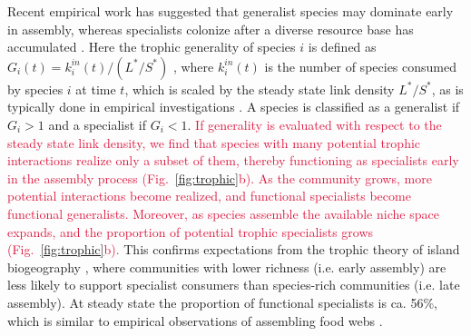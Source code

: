 \documentclass[twocolumn,preprintnumbers,amsmath,amssymb,superscriptaddress,linenumbers]{revtex4-1}
\newcommand{\rr}[1]{{\rm #1}}
\newcommand{\rev}[1]{\textcolor{crimson}{#1}}
\begin{document}
% 




Recent empirical work has suggested that generalist species may dominate early in assembly, whereas specialists colonize after a diverse resource base has accumulated \cite{Piechnik2008,Gravel2011}.
Here the trophic generality of species $i$ is defined as $G_i(t) = k_i^{in}(t)/(L^*/S^*)$ \cite{Williams2000}, where $k_i^{in}(t)$ is the number of species consumed by species $i$ at time $t$, which is scaled by the steady state link density $L^*/S^*$, as is typically done in empirical investigations \cite{Piechnik2008}.
A species is classified as a generalist if $G_i > 1$ and a specialist if $G_i < 1$.
\rev{If generality is evaluated with respect to the steady state link density, we find that species with many potential trophic interactions realize only a subset of them, thereby functioning as specialists early in the assembly process (Fig.\ \ref{fig:trophic}b).
As the community grows, more potential interactions become realized, and functional specialists become functional generalists.
Moreover, as species assemble the available niche space expands, and the proportion of potential trophic specialists grows (Fig.\ \ref{fig:trophic}b).}
This confirms expectations from the trophic theory of island biogeography \cite{Gravel2011}, where communities with lower richness (i.e. early assembly) are less likely to support specialist consumers than species-rich communities (i.e. late assembly).
At steady state the proportion of functional specialists is ca. 56\%, which is similar to empirical observations of assembling food webs \cite{Piechnik2008}.
\end{document}
